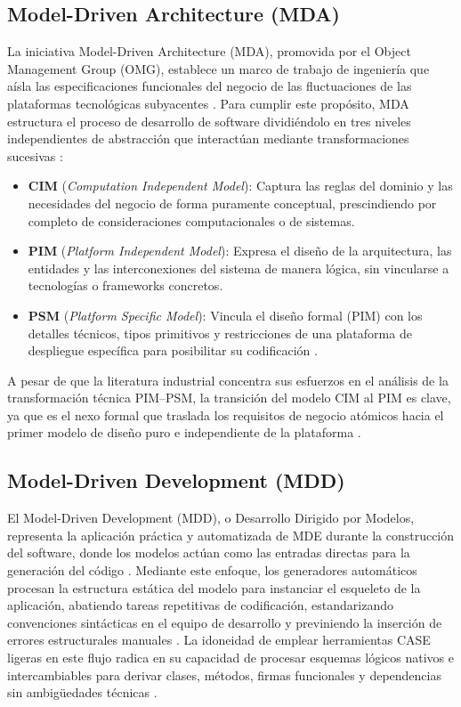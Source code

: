 \documentclass[journal,onecolumn]{IEEEtran}
\begin{document}
	\subsection{Model-Driven Architecture (MDA)}
	La iniciativa Model-Driven Architecture (MDA), promovida por el Object Management Group (OMG), establece un marco de trabajo de ingeniería que aísla las especificaciones funcionales del negocio de las fluctuaciones de las plataformas tecnológicas subyacentes \cite{OMG2014MDA}. Para cumplir este propósito, MDA estructura el proceso de desarrollo de software dividiéndolo en tres niveles independientes de abstracción que interactúan mediante transformaciones sucesivas \cite{OMG2014MDA}:
	\begin{itemize}
		\item \textbf{CIM} (\textit{Computation Independent Model}): Captura las reglas del dominio y las necesidades del negocio de forma puramente conceptual, prescindiendo por completo de consideraciones computacionales o de sistemas.
		\item \textbf{PIM} (\textit{Platform Independent Model}): Expresa el diseño de la arquitectura, las entidades y las interconexiones del sistema de manera lógica, sin vincularse a tecnologías o frameworks concretos.
		\item \textbf{PSM} (\textit{Platform Specific Model}): Vincula el diseño formal (PIM) con los detalles técnicos, tipos primitivos y restricciones de una plataforma de despliegue específica para posibilitar su codificación \cite{Silega2022}.
	\end{itemize}
	A pesar de que la literatura industrial concentra sus esfuerzos en el análisis de la transformación técnica PIM–PSM, la transición del modelo CIM al PIM es clave, ya que es el nexo formal que traslada los requisitos de negocio atómicos hacia el primer modelo de diseño puro e independiente de la plataforma \cite{Silega2022}.
	
	\subsection{Model-Driven Development (MDD)}
	El Model-Driven Development (MDD), o Desarrollo Dirigido por Modelos, representa la aplicación práctica y automatizada de MDE durante la construcción del software, donde los modelos actúan como las entradas directas para la generación del código \cite{Brambilla2017, Selic2003}. Mediante este enfoque, los generadores automáticos procesan la estructura estática del modelo para instanciar el esqueleto de la aplicación, abatiendo tareas repetitivas de codificación, estandarizando convenciones sintácticas en el equipo de desarrollo y previniendo la inserción de errores estructurales manuales \cite{Whittle2014, Huning2021SafetyMechanisms}. La idoneidad de emplear herramientas CASE ligeras en este flujo radica en su capacidad de procesar esquemas lógicos nativos e intercambiables para derivar clases, métodos, firmas funcionales y dependencias sin ambigüedades técnicas \cite{Durai2022XMI}.
	
\end{document}
